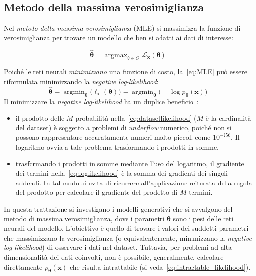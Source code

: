 \subsection{Metodo della massima verosimiglianza}
\label{appendix:MLE}

Nel \emph{metodo della massima verosimiglianza} (MLE) si massimizza la 
funzione di verosimiglianza per trovare un modello che ben si adatti ai dati di interesse:

\begin{equation}
\hat{\bm{\theta}}=\operatorname{argmax}_{\bm{\theta} \in \Theta} \mathcal{L}_{\mathbf{x}}(\bm{\theta}) \label{eq:MLE}
\end{equation}

\noindent Poiché le reti neurali \emph{minimizzano} una funzione di costo, la~\eqref{eq:MLE} può essere riformulata minimizzando la \emph{negative log-likelihood}:
\begin{equation}
\hat{\bm{\theta}}=\operatorname{argmin}_{\bm{\theta}}\bigl({\ell}_{\mathbf{x}}(\bm{\theta})\bigr)=\operatorname{argmin}_{\bm{\theta}}\bigl(-\log p_{\bm{\theta}}(\mathbf{x})\bigr)\label{eq:log_MLE}
\end{equation}
Il minimizzare la \emph{negative log-likelihood} ha un duplice beneficio~\cite{deisenrothMML2020}:
\begin{itemize}
\item il prodotto delle $M$ probabilità nella~\eqref{eq:datasetlikelihood} ($M$ è la cardinalità del dataset) è soggetto a problemi di \emph{underflow} numerico, 
poiché non si possono rappresentare accuratamente numeri molto piccoli come $10^{-256}$. Il logaritmo 
ovvia a tale problema trasformando i prodotti in somme.
\item trasformando i prodotti in somme mediante l'uso del logaritmo, 
il gradiente dei termini nella~\eqref{eq:loglikelihood} è la somma dei gradienti dei singoli addendi. 
In tal modo si evita di ricorrere all'applicazione reiterata della regola del prodotto per calcolare 
il gradiente del prodotto di $M$ termini.
\end{itemize}

\noindent In questa trattazione si investigano i modelli generativi che si avvalgono del metodo di massima verosimiglianza,
dove i parametri $\bm{\theta}$ sono i pesi delle reti neurali del modello.
L'obiettivo è quello di trovare i valori dei suddetti parametri che massimizzano la verosimiglianza 
(o equivalentemente, minimizzano la \emph{negative log-likelihood}) di osservare i dati nel dataset.
Tuttavia, per problemi ad alta dimensionalità dei dati coinvolti, non è possibile, generalmente, calcolare direttamente $p_{\bm{\theta}}(\mathbf{x})$ 
che risulta intrattabile (si veda~\eqref{eq:intractable_likelihood}).